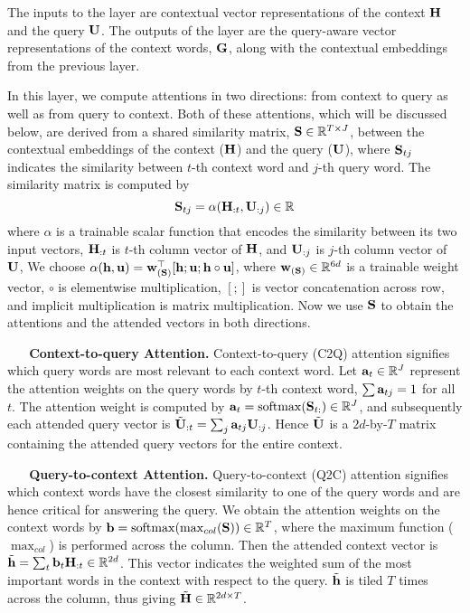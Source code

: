 \documentclass{article} \usepackage{iclr2017_conference,times}
\begin{document}
The inputs to the layer are contextual vector representations of the context ${\bf H}$ and the query ${\bf U}$. 
The outputs of the layer are the query-aware vector representations of the context words, ${\bf G}$, along with the contextual embeddings from the previous layer.

In this layer, we compute attentions in two directions: from context to query as well as from query to context. 
Both of these attentions, which will be discussed below, are derived from a shared similarity matrix, ${\bf S} \in \mathbb{R}^{T \times J}$, between the contextual embeddings of the context (${\bf H}$) and the query (${\bf U}$), 
where ${\bf S}_{tj}$ indicates the similarity between $t$-th context word and $j$-th query word.
The similarity matrix is computed by
\begin{equation}\label{eqn:sim}
{\bf S}_{tj} = \alpha({\bf H}_{:t}, {\bf U}_{:j}) \in \mathbb{R}
\end{equation}
where $\alpha$ is a trainable scalar function that encodes the similarity between its two input vectors,
${\bf H}_{:t}$ is $t$-th column vector of ${\bf H}$, and
${\bf U}_{:j}$ is $j$-th column vector of ${\bf U}$,
We choose $\alpha({\bf h}, {\bf u}) = {\bf w}^\top_{({\bf S})} [{\bf h}; {\bf u}; {\bf h} \circ {\bf u}]$,
where ${\bf w}_{({\bf S})} \in \mathbb{R}^{6d}$ is a trainable weight vector, 
$\circ$ is elementwise multiplication,
$[;]$ is vector concatenation across row,
and implicit multiplication is matrix multiplication.
Now we use ${\bf S}$ to obtain the attentions and the attended vectors in both directions.

\textbf{\ \ \ Context-to-query Attention.} 
Context-to-query (C2Q) attention signifies which query words are most relevant to each context word.
Let ${\bf a}_t \in \mathbb{R}^J$ represent the attention weights on the query words by $t$-th context word, $\sum {\bf a}_{tj} = 1$ for all $t$. The attention weight is computed by ${\bf a}_t = \mathrm{softmax}({\bf S}_{t:}) \in \mathbb{R}^J$,
and subsequently each attended query vector is $\tilde{{\bf U}}_{:t} = \sum_j {\bf a}_{tj} {\bf U}_{:j}$.
Hence $\tilde{{\bf U}}$ is a $2d$-by-$T$ matrix containing the attended query vectors for the entire context.

\textbf{\ \ \ Query-to-context Attention.}
Query-to-context (Q2C) attention signifies which context words have the closest similarity to one of the query words and are hence critical for answering the query. We obtain the attention weights on the context words by ${\bf b} = \mathrm{softmax}(\max_{col} ({\bf S})) \in \mathbb{R}^T$, where the maximum function ($\max_{col}$) is performed across the column. Then the attended context vector is $\tilde{\bf h} = \sum_t {\bf b}_t {\bf H}_{:t} \in \mathbb{R}^{2d}$. This vector  indicates the weighted sum of the most important words in the context with respect to the query.
$\tilde{\bf h}$ is tiled $T$ times across the column, thus giving $\tilde{\bf H} \in \mathbb{R}^{2d \times T}$.
\end{document}
